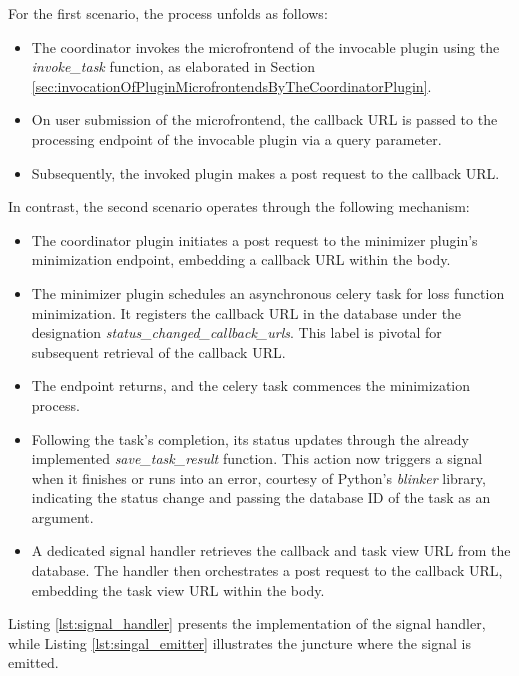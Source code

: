 \documentclass[
  a4paper,  %
  twoside,  %
  bibliography=totoc,
  headsepline,
  cleardoublepage=empty,
  parskip=half,
  draft=false
]{scrbook}
\begin{document}
For the first scenario, the process unfolds as follows:
\begin{itemize}
    \item The coordinator invokes the microfrontend of the invocable plugin using the \emph{invoke\_task} function, as elaborated in Section \ref{sec:invocationOfPluginMicrofrontendsByTheCoordinatorPlugin}.
    \item On user submission of the microfrontend, the callback URL is passed to the processing endpoint of the invocable plugin via a query parameter.
    \item Subsequently, the invoked plugin makes a post request to the callback URL.
\end{itemize}

In contrast, the second scenario operates through the following mechanism:
\begin{itemize}
    \item The coordinator plugin initiates a post request to the minimizer plugin's minimization endpoint, embedding a callback URL within the body.
    \item The minimizer plugin schedules an asynchronous celery task for loss function minimization.
    It registers the callback URL in the database under the designation \emph{status\_changed\_callback\_urls}.
    This label is pivotal for subsequent retrieval of the callback URL.
    \item The endpoint returns, and the celery task commences the minimization process.
    \item Following the task's completion, its status updates through the already implemented \emph{save\_task\_result} function.
    This action now triggers a signal when it finishes or runs into an error, courtesy of Python's \emph{blinker} library, indicating the status change and passing the database ID of the task as an argument.
    \item A dedicated signal handler retrieves the callback and task view URL from the database.
    The handler then orchestrates a post request to the callback URL, embedding the task view URL within the body.
\end{itemize}
Listing \ref{lst:signal_handler} presents the implementation of the signal handler, while Listing \ref{lst:singal_emitter} illustrates the juncture where the signal is emitted.

\noindent\begin{minipage}{\linewidth}
  
\end{minipage}
\end{document}
